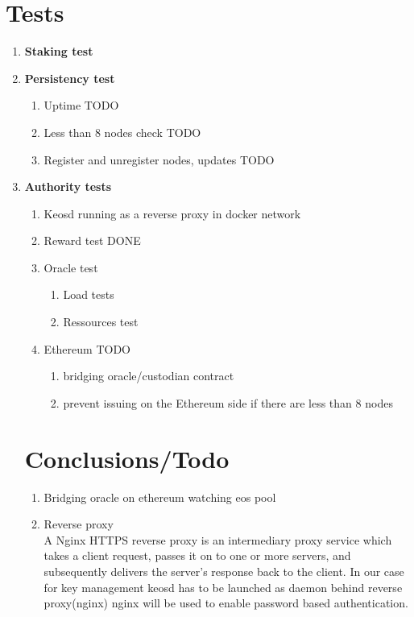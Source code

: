 \documentclass[]{article}
\begin{document}
\section{Tests}
					\begin{enumerate}
						\item \textbf{Staking test}
						
						\item \textbf{Persistency test}  
							\begin{enumerate}
								\item Uptime {\color{red} TODO}
								\item Less than 8 nodes check   {\color{red} TODO}
								\item Register and unregister nodes, updates  {\color{red} TODO}
							\end{enumerate}
						\item \textbf{Authority tests}
							\begin{enumerate}
							\item Keosd running as a reverse proxy in docker network
							\item Reward test	 {\color{green} DONE}
								
								\item Oracle test	
							\begin{enumerate}						
								\item Load tests
									\item Ressources test 	 			
							\end{enumerate}
							\item Ethereum {\color{red} TODO}  
						   \begin{enumerate}
						   		\item bridging oracle/custodian contract
						   	\item prevent issuing on the Ethereum side if there are less than 8 nodes 
						   	\end{enumerate}
						
				\end{enumerate}

\section{Conclusions/Todo}
\begin{enumerate}
		\item Bridging oracle on ethereum watching eos pool  
		\item Reverse proxy \\
		A Nginx HTTPS reverse proxy is an intermediary proxy service which takes a client request, passes it on to one or more servers, and subsequently delivers the server's response back to the client. 
		In our case for key management keosd has to be launched as daemon behind reverse proxy(nginx)
		nginx will be used to enable password based authentication.
		

\end{enumerate}
\end{enumerate}
\end{document}
